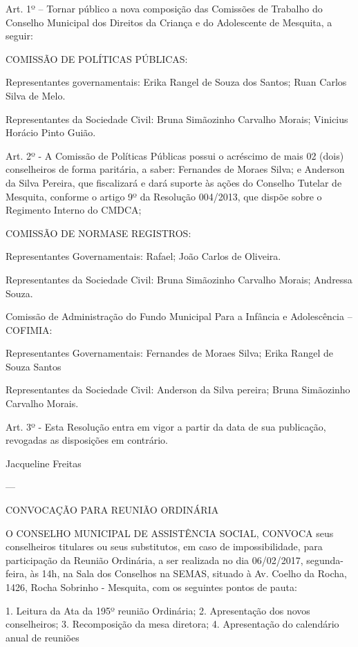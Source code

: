 \documentclass{doliberto}
\begin{document}
Art. 1º – Tornar público a nova composição das Comissões 
de Trabalho do Conselho Municipal dos Direitos da Criança 
e do Adolescente de Mesquita, a seguir: 

COMISSÃO DE POLÍTICAS PÚBLICAS:  
 
Representantes  governamentais:  Erika  Rangel  de  Souza 
dos Santos; Ruan Carlos Silva de Melo.  
 
Representantes  da  Sociedade  Civil:  Bruna  Simãozinho 
Carvalho Morais; Vinicius Horácio Pinto Guião.  
 
Art.  2º  -  A  Comissão  de  Políticas  Públicas  possui  o 
acréscimo  de  mais  02  (dois)  conselheiros  de  forma 
paritária, a saber: Fernandes de Moraes Silva; e Anderson da 
Silva  Pereira,  que  fiscalizará  e  dará  suporte  às  ações  do 
Conselho  Tutelar  de  Mesquita,  conforme  o  artigo  9º  da 
Resolução  004/2013,  que  dispõe  sobre  o  Regimento 
Interno do CMDCA;  
 
COMISSÃO DE NORMASE REGISTROS: 
 
Representantes  Governamentais: 
Rafael; João Carlos de Oliveira. 
 
Representantes  da  Sociedade  Civil:  Bruna  Simãozinho 
Carvalho Morais; Andressa Souza. 
 
Comissão de Administração do Fundo Municipal Para a 
Infância e Adolescência – COFIMIA: 
 
Representantes  Governamentais:  Fernandes  de  Moraes 
Silva; Erika Rangel de Souza Santos 
 
Representantes  da  Sociedade  Civil:  Anderson  da  Silva 
pereira; Bruna Simãozinho Carvalho Morais. 
 
Art. 3º - Esta Resolução entra em vigor a partir da data de 
sua publicação, revogadas as disposições em contrário. 

Jacqueline  Freitas 

---

CONVOCAÇÃO PARA REUNIÃO ORDINÁRIA 

O  CONSELHO  MUNICIPAL  DE  ASSISTÊNCIA  SOCIAL, 
CONVOCA  seus  conselheiros  titulares  ou  seus  substitutos, 
em  caso  de  impossibilidade,  para  participação  da  Reunião 
Ordinária,  a  ser  realizada  no  dia  06/02/2017,  segunda-
feira, às 14h, na Sala dos Conselhos na SEMAS, situado à Av. 
Coelho da Rocha, 1426, Rocha Sobrinho - Mesquita, com os 
seguintes pontos de pauta: 

1.  Leitura da Ata da 195º reunião Ordinária; 
2.  Apresentação dos novos conselheiros; 
3.  Recomposição da mesa diretora; 
4.  Apresentação  do  calendário  anual  de  reuniões 
\end{document}

